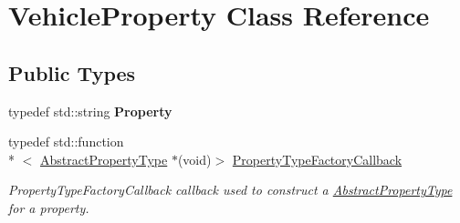 \hypertarget{classVehicleProperty}{\section{Vehicle\-Property Class Reference}
\label{classVehicleProperty}
}
\subsection*{Public Types}
\begin{DoxyCompactItemize}
\item 
\hypertarget{classVehicleProperty_acf303d050168f571e838813f3e6042d1}{typedef std\-::string {\bfseries Property}}\label{classVehicleProperty_acf303d050168f571e838813f3e6042d1}

\item 
typedef std\-::function\\*
$<$ \hyperlink{classAbstractPropertyType}{Abstract\-Property\-Type} $\ast$(void)$>$ \hyperlink{classVehicleProperty_a6fdd075ce5b867b571020fcdc723ddcf}{Property\-Type\-Factory\-Callback}
\begin{DoxyCompactList}\small\item\em Property\-Type\-Factory\-Callback callback used to construct a \hyperlink{classAbstractPropertyType}{Abstract\-Property\-Type} for a property. \end{DoxyCompactList}\end{DoxyCompactItemize}
